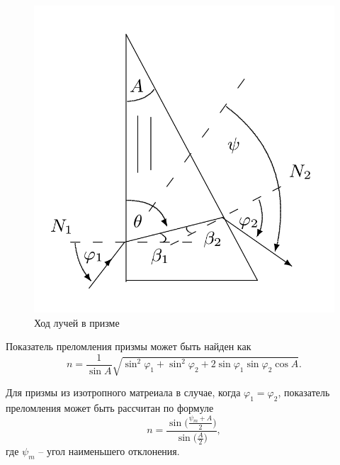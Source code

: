 \documentclass[a4paper,12pt]{article}
\begin{document}
\begin{figure}[H]
    \centering
    \includegraphics[scale=0.3]{prism.png}
    \caption{Ход лучей в призме}
\end{figure}

\noindent Показатель преломления призмы может быть найден как
\begin{equation}
    n = \frac{1}{\sin A} \sqrt{\sin^2\varphi_1 + \sin^2\varphi_2 + 2\sin\varphi_1\sin\varphi_2\cos A}.
\end{equation}

\noindent Для призмы из изотропного матреиала в случае, когда $\varphi_1 = \varphi_2$, показатель преломления может быть рассчитан по формуле
\begin{equation}
    n = \frac{ \sin\big( \frac{\psi_m + A}{2} \big) }{ \sin\big(\frac{A}{2}\big) },
\end{equation}
где $\psi_m$ -- угол наименьшего отклонения.
\end{document}
